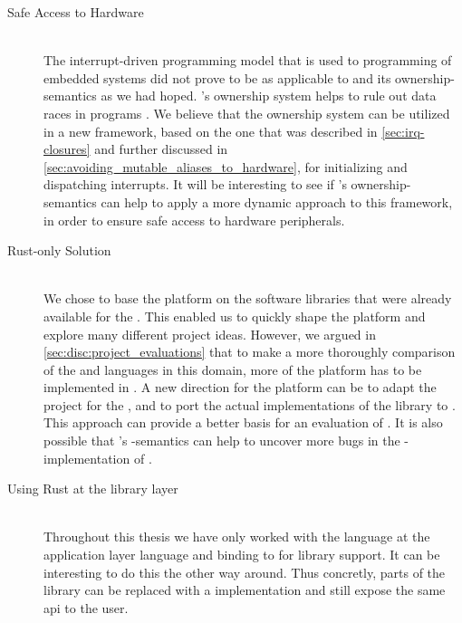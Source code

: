 \begin{description}
\item[Safe Access to Hardware] \hfill \\
  The interrupt-driven programming model that is used to programming of embedded systems did not prove to be as applicable to {\rust} and its ownership-semantics as we had hoped.
  {\rust}'s ownership system helps to rule out data races in programs \cite{web:rust_book}.
  We believe that the ownership system can be utilized in a new framework, based on the one that was described in \autoref{sec:irq-closures} and further discussed in \autoref{sec:avoiding_mutable_aliases_to_hardware}, for initializing and dispatching interrupts.
  It will be interesting to see if {\rust}'s ownership-semantics can help to apply a more dynamic approach to this framework, in order to ensure safe access to hardware peripherals.

\item[Rust-only Solution] \hfill \\
  We chose to base the {\rg} platform on the software libraries that were already available for the {\gecko}.
  This enabled us to quickly shape the platform and explore many different project ideas.
  However, we argued in \autoref{sec:disc:project_evaluations} that to make a more thoroughly comparison of the {\C} and {\rust} languages in this domain, more of the platform has to be implemented in {\rust}.
  A new direction for the platform can be to adapt the {\zinc} project for the {\gecko}, and to port the actual implementations of the {\emlib} library to {\rust}.
  This approach can provide a better basis for an evaluation of {\rust}.
  It is also possible that {\rust}'s -semantics can help to uncover more bugs in the {\C}-implementation of {\emlib}.

\item[Using Rust at the library layer] \hfill \\
  Throughout this thesis we have only worked with the {\rust} language at the application layer language and binding to {\C} for library support.
  It can be interesting to do this the other way around.
  Thus concretly, parts of the {\emlib} library can be replaced with a {\rust} implementation and still expose the same \gls{api} to the user.

\end{description}
